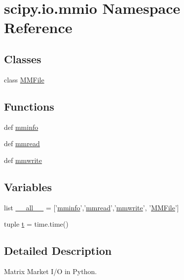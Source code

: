 \hypertarget{namespacescipy_1_1io_1_1mmio}{}\section{scipy.\+io.\+mmio Namespace Reference}
\label{namespacescipy_1_1io_1_1mmio}
\subsection*{Classes}
\begin{DoxyCompactItemize}
\item 
class \hyperlink{classscipy_1_1io_1_1mmio_1_1MMFile}{M\+M\+File}
\end{DoxyCompactItemize}
\subsection*{Functions}
\begin{DoxyCompactItemize}
\item 
def \hyperlink{namespacescipy_1_1io_1_1mmio_afa0d5d7e918a5f53d284fc172ada6e8b}{mminfo}
\item 
def \hyperlink{namespacescipy_1_1io_1_1mmio_a02a409773ea82c94dc360024b6ac6f4a}{mmread}
\item 
def \hyperlink{namespacescipy_1_1io_1_1mmio_a18cd344ea8fa15889cf854af92ac4fbc}{mmwrite}
\end{DoxyCompactItemize}
\subsection*{Variables}
\begin{DoxyCompactItemize}
\item 
list \hyperlink{namespacescipy_1_1io_1_1mmio_a04d5a5aaa4b830185be9b855e4a40090}{\+\_\+\+\_\+all\+\_\+\+\_\+} = \mbox{[}'\hyperlink{namespacescipy_1_1io_1_1mmio_afa0d5d7e918a5f53d284fc172ada6e8b}{mminfo}','\hyperlink{namespacescipy_1_1io_1_1mmio_a02a409773ea82c94dc360024b6ac6f4a}{mmread}','\hyperlink{namespacescipy_1_1io_1_1mmio_a18cd344ea8fa15889cf854af92ac4fbc}{mmwrite}', '\hyperlink{classscipy_1_1io_1_1mmio_1_1MMFile}{M\+M\+File}'\mbox{]}
\item 
tuple \hyperlink{namespacescipy_1_1io_1_1mmio_a0580a316597da83a0ecbaf3025a0414e}{t} = time.\+time()
\end{DoxyCompactItemize}


\subsection{Detailed Description}
\begin{DoxyVerb}  Matrix Market I/O in Python.
\end{DoxyVerb}
 


